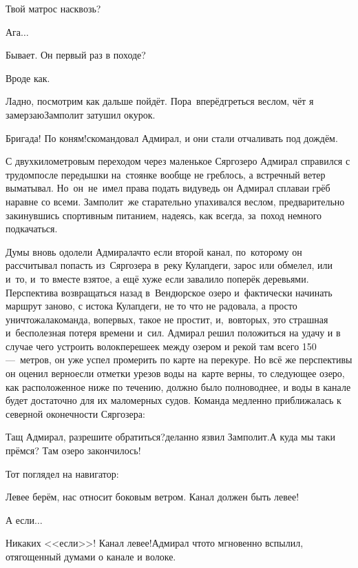 \diagdash Твой матрос насквозь?

\diagdash Ага$\ldots$

\diagdash Бывает. Он первый раз в походе?

\diagdash Вроде как.

\diagdash Ладно, посмотрим как дальше пойдёт. Пора~вперёд\mdash греться веслом, чёт я замерзаю\mdash Замполит затушил окурок.

\diagdash Бригада! По коням!\mdash скомандовал Адмирал, и они стали отчаливать под дождём.

С двухкилометровым переходом через маленькое Сяргозеро Адмирал справился с трудом\mdash после передышки на~стоянке вообще не греблось, а встречный ветер выматывал. Но~он~не~имел права подать виду\mdash ведь он Адмирал сплава\mdash и грёб наравне со всеми. Замполит~же старательно упахивался веслом, предварительно закинувшись спортивным питанием, надеясь, как всегда, за~поход немного подкачаться. 

Думы вновь одолели Адмирала\mdash что если второй канал, по~которому он рассчитывал попасть из~Сяргозера в~реку Кулапдеги, зарос или обмелел, или и~то, и~то вместе взятое, а ещё хуже если завалило поперёк деревьями. Перспектива возвращаться назад в~Вендюрское озеро и~фактически начинать маршрут заново, с истока Кулапдеги, не то что не радовала, а просто уничтожала\mdash команда, во\sdash первых, такое не простит, и,~во\sdash вторых, это страшная и~бесполезная потеря времени и~сил. Адмирал решил положиться на удачу и в случае чего устроить волок\mdash перешеек между озером и рекой там всего 150\thinspace\nobreakdash---~метров, он уже успел промерить по карте на перекуре. Но всё же перспективы он оценил верно\mdash если отметки урезов воды на~карте верны, то следующее озеро, как расположенное ниже по течению, должно было полноводнее, и воды в канале будет достаточно для их маломерных судов. Команда медленно приближалась к северной оконечности Сяргозера:

\diagdash Тащ Адмирал, разрешите обратиться?\mdash деланно язвил Замполит.\mdash А куда мы таки прёмся? Там озеро закончилось!

Тот поглядел на навигатор:

\diagdash Левее берём, нас относит боковым ветром. Канал должен быть левее!

\diagdash А если$\ldots$

\diagdash Никаких <<если>>! Канал левее!\mdash Адмирал что\sdash то мгновенно вспылил, отягощенный думами о канале и волоке.

